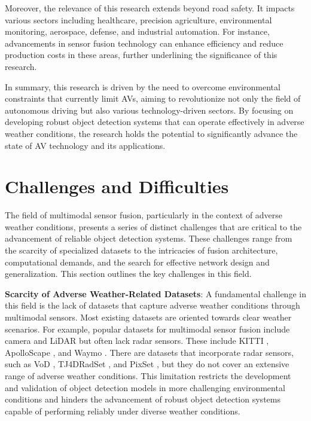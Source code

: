 \documentclass[report.tex]{subfiles}
\begin{document}
        Moreover, the relevance of this research extends beyond road safety. It impacts various sectors including healthcare, precision agriculture, environmental monitoring, aerospace, defense, and industrial automation. For instance, advancements in sensor fusion technology can enhance efficiency and reduce production costs in these areas, further underlining the significance of this research.

        In summary, this research is driven by the need to overcome environmental constraints that currently limit AVs, aiming to revolutionize not only the field of autonomous driving but also various technology-driven sectors. By focusing on developing robust object detection systems that can operate effectively in adverse weather conditions, the research holds the potential to significantly advance the state of AV technology and its applications.

    \section{Challenges and Difficulties}

        The field of multimodal sensor fusion, particularly in the context of adverse weather conditions, presents a series of distinct challenges that are critical to the advancement of reliable object detection systems. These challenges range from the scarcity of specialized datasets to the intricacies of fusion architecture, computational demands, and the search for effective network design and generalization. This section outlines the key challenges in this field.

        \textbf{Scarcity of Adverse Weather-Related Datasets}: A fundamental challenge in this field is the lack of datasets that capture adverse weather conditions through multimodal sensors. Most existing datasets are oriented towards clear weather scenarios. For example, popular datasets for multimodal sensor fusion include camera and LiDAR but often lack radar sensors. These include KITTI \cite{geiger2012we}, ApolloScape \cite{huang2019apolloscape}, and Waymo \cite{sun2020scalability}. There are datasets that incorporate radar sensors, such as VoD \cite{palffy2022multi}, TJ4DRadSet \cite{zheng2022tj4dradset}, and PixSet \cite{deziel2021pixset}, but they do not cover an extensive range of adverse weather conditions. This limitation restricts the development and validation of object detection models in more challenging environmental conditions and hinders the advancement of robust object detection systems capable of performing reliably under diverse weather conditions.
\end{document}
